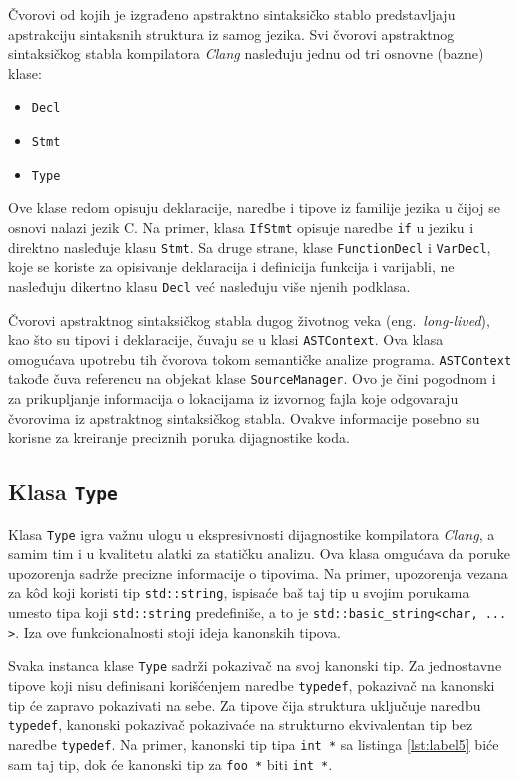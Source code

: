 \documentclass[12pt,oneside]{memoir}
\begin{document}
\v{C}vorovi od kojih je izgrađeno apstraktno sintaksi\v{c}ko stablo predstavljaju apstrakciju sintaksnih struktura iz samog jezika.
Svi \v{c}vorovi apstraktnog sintaksi\v{c}kog stabla kompilatora \textit{Clang} nasleđuju jednu od tri osnovne (bazne) klase:
\begin{itemize}
  \item \texttt{Decl}
  \item \texttt{Stmt}
  \item \texttt{Type}
\end{itemize}
Ove klase redom opisuju deklaracije, naredbe i tipove iz familije jezika u \v{c}ijoj se osnovi nalazi jezik C.
Na primer, klasa \texttt{IfStmt} opisuje naredbe \texttt{if} u jeziku i direktno nasleđuje klasu \texttt{Stmt}. Sa druge strane, klase \texttt{FunctionDecl} i \texttt{VarDecl}, koje se koriste za opisivanje deklaracija i definicija funkcija i varijabli, ne nasleđuju dikertno klasu \texttt{Decl} ve\'{c} nasleđuju vi\v{s}e njenih podklasa.
\par
\v{C}vorovi apstraktnog sintaksi\v{c}kog stabla dugog \v{z}ivotnog veka (eng.~\textit{long-lived}), kao \v{s}to su tipovi i deklaracije, \v{c}uvaju se u klasi \texttt{ASTContext}. Ova klasa
omogu\'{c}ava upotrebu tih \v{c}vorova tokom semanti\v{c}ke analize programa. \texttt{ASTContext} takođe \v{c}uva referencu na objekat klase \texttt{SourceManager}. Ovo je
\v{c}ini pogodnom i za prikupljanje informacija o lokacijama iz izvornog fajla koje odgovaraju \v{c}vorovima iz apstraktnog sintaksi\v{c}kog stabla. Ovakve informacije posebno su korisne za kreiranje
preciznih poruka dijagnostike koda.

\subsection{Klasa \texttt{Type}}
  Klasa \texttt{Type} igra va\v{z}nu ulogu u ekspresivnosti dijagnostike kompilatora \textit{Clang}, a samim tim i u kvalitetu alatki za stati\v{c}ku analizu. Ova klasa omgu\'{c}ava da poruke upozorenja sadr\v{z}e precizne informacije o tipovima. Na primer, upozorenja vezana za k\^{o}d koji koristi tip \texttt{std::string}, ispisa\'{c}e ba\v{s} taj tip u svojim porukama umesto tipa koji \texttt{std::string} predefini\v{s}e, a to je \texttt{std::basic\_string<char, ... >}. Iza ove funkcionalnosti stoji ideja kanonskih tipova.
  
  \par
  Svaka instanca klase \texttt{Type} sadr\v{z}i pokaziva\v{c} na svoj kanonski tip. Za jednostavne tipove koji nisu definisani kori\v{s}\'{c}enjem naredbe \texttt{typedef}, pokaziva\v{c} na kanonski tip \'{c}e zapravo pokazivati na sebe. Za tipove \v{c}ija struktura uklju\v{c}uje naredbu \texttt{typedef}, kanonski pokaziva\v{c} pokaziva\'{c}e na strukturno ekvivalentan tip bez naredbe \texttt{typedef}.
  Na primer, kanonski tip tipa \texttt{int *} sa listinga \ref{lst:label5}  bi\'{c}e sam taj tip, dok \'{c}e kanonski tip za \texttt{foo *} biti \texttt{int *}.
\end{document}
